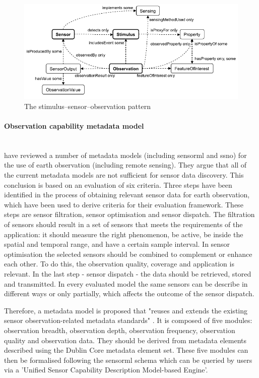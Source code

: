\begin{figure}
	\centering
	\includegraphics[width=1\linewidth]{figs/sens_stim_obs.png}
	\caption{The stimulus–sensor–observation pattern \cite[p. 28]{SSW:SSN_incubatorGroup}}
	\label{fig:sens-stim-obs}
\end{figure}

\paragraph{Observation capability metadata model} \mbox{}\\
\cite{SW:Hu} have reviewed a number of metadata models (including \ac{sensorml} and \ac{ssno}) for the use of earth observation (including remote sensing). They argue that all of the current metadata models are not sufficient for sensor data discovery. This conclusion is based on an evaluation of six criteria. Three steps have been identified in the process of obtaining relevant sensor data for earth observation, which have been used to derive criteria for their evaluation framework. These steps are sensor filtration, sensor optimisation and sensor dispatch. The filtration of sensors should result in a set of sensors that meets the requirements of the application: it should measure the right phenomenon, be active, be inside the spatial and temporal range, and have a certain sample interval. In sensor optimisation the selected sensors should be combined to complement or enhance each other. To do this, the observation quality, coverage and application is relevant. In the last step - sensor dispatch - the data should be retrieved, stored and transmitted. In every evaluated model the same sensors can be describe in different ways or only partially, which affects the outcome of the sensor dispatch. 

Therefore, a metadata model is proposed that "reuses and extends the existing sensor observation-related metadata standards" \cite[p. 10546]{SW:Hu}. It is composed of five modules: observation breadth, observation depth, observation frequency, observation quality and observation data. They should be derived from metadata elements described using the Dublin Core metadata element set. These five modules can then be formalised following the \ac{sensorml} schema which can be queried by users via a 'Unified Sensor Capability Description Model-based Engine'. 

